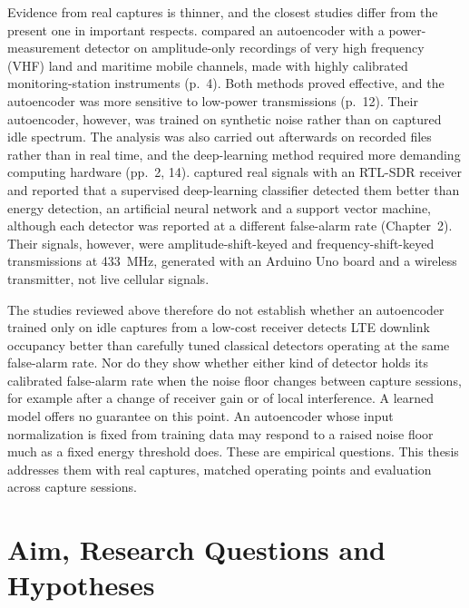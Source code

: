 Evidence from real captures is thinner, and the closest studies differ from the present one in important respects. \Textcite{torio2025} compared an autoencoder with a power-measurement detector on amplitude-only recordings of very high frequency (VHF) land and maritime mobile channels, made with highly calibrated monitoring-station instruments (p.~4). Both methods proved effective, and the autoencoder was more sensitive to low-power transmissions (p.~12). Their autoencoder, however, was trained on synthetic noise rather than on captured idle spectrum. The analysis was also carried out afterwards on recorded files rather than in real time, and the deep-learning method required more demanding computing hardware (pp.~2, 14). \Textcite{saber2021} captured real signals with an RTL-SDR receiver and reported that a supervised deep-learning classifier detected them better than energy detection, an artificial neural network and a support vector machine, although each detector was reported at a different false-alarm rate (Chapter~2). Their signals, however, were amplitude-shift-keyed and frequency-shift-keyed transmissions at \qty{433}{\mega\hertz}, generated with an Arduino Uno board and a wireless transmitter, not live cellular signals.

The studies reviewed above therefore do not establish whether an autoencoder trained only on idle captures from a low-cost receiver detects LTE downlink occupancy better than carefully tuned classical detectors operating at the same false-alarm rate. Nor do they show whether either kind of detector holds its calibrated false-alarm rate when the noise floor changes between capture sessions, for example after a change of receiver gain or of local interference. A learned model offers no guarantee on this point. An autoencoder whose input normalization is fixed from training data may respond to a raised noise floor much as a fixed energy threshold does. These are empirical questions. This thesis addresses them with real captures, matched operating points and evaluation across capture sessions.

\section{Aim, Research Questions and Hypotheses}
\label{sec:aim}

